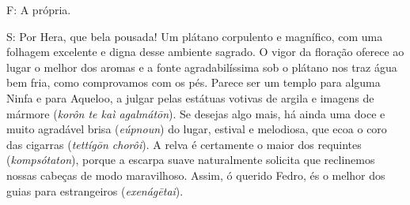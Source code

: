 \bekker{[230b]} F: A própria.

S: Por Hera, que bela pousada! Um plátano
corpulento e magnífico, com uma folhagem excelente e digna desse
ambiente sagrado. O vigor da floração oferece ao lugar o melhor dos
aromas e a fonte agradabilíssima sob o plátano nos traz água bem fria,
como comprovamos com os pés. Parece ser um templo para alguma Ninfa e
para Aqueloo, a julgar pelas estátuas votivas de argila e imagens de
mármore (\emph{korôn te kaì agalmátōn}). \bekker{[230c]} Se desejas
algo mais, há ainda uma doce e muito agradável brisa (\emph{eúpnoun}) do
lugar, estival e melodiosa, que ecoa o coro das cigarras (\emph{tettígōn
chorôi}). A relva é certamente o maior dos requintes
(\emph{kompsótaton}), porque a escarpa suave naturalmente solicita que
reclinemos nossas cabeças de modo maravilhoso. Assim, ó querido Fedro,
és o melhor dos guias para estrangeiros (\emph{exenágētai}).

